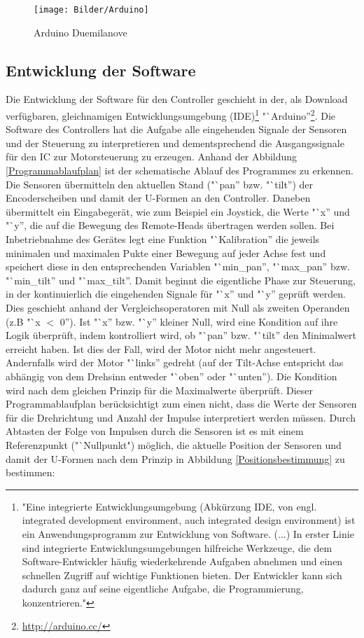 \documentclass[a4paper, 12pt, bibliography=totocnumbered, listof=numbered]{scrartcl}
\begin{document}
	\begin{figure}[htb]
		\centering
		\texttt{[image: Bilder/Arduino]}
		\caption{Arduino Duemilanove}
		\label{Arduino}
	\end{figure}

	\subsection{Entwicklung der Software}
	Die Entwicklung der Software für den Controller geschieht in der, als Download verfügbaren, gleichnamigen Entwicklungsumgebung (IDE)\footnote{"Eine integrierte Entwicklungsumgebung (Abkürzung IDE, von engl. integrated development environment, auch integrated design environment) ist ein Anwendungsprogramm zur Entwicklung von Software. (...) In erster Linie sind integrierte Entwicklungsumgebungen hilfreiche Werkzeuge, die dem Software-Entwickler häufig wiederkehrende Aufgaben abnehmen und einen schnellen Zugriff auf wichtige Funktionen bieten. Der Entwickler kann sich dadurch ganz auf seine eigentliche Aufgabe, die Programmierung, konzentrieren."\cite{wikipedia-ide}} "`Arduino”\footnote{\url{http://arduino.cc/}}.
	Die Software des Controllers hat die Aufgabe alle eingehenden Signale der Sensoren und der Steuerung zu interpretieren und dementsprechend die Ausgangssignale für den IC zur Motorsteuerung zu erzeugen.
	Anhand der Abbildung \ref{Programmablaufplan} ist der schematische Ablauf des Programmes zu erkennen. Die Sensoren übermitteln den aktuellen Stand ("`pan'' bzw. "`tilt'') der Encoderscheiben und damit der U-Formen an den Controller. Daneben übermittelt ein Eingabegerät, wie zum Beispiel ein Joystick, die Werte "`x'' und "`y'', die auf die Bewegung des Remote-Heads übertragen werden sollen. Bei Inbetriebnahme des Gerätes legt eine Funktion "`Kalibration'' die jeweils minimalen und maximalen Pukte einer Bewegung auf jeder Achse fest und speichert diese in den entsprechenden Variablen "`min\_pan'', "`max\_pan'' bzw. "`min\_tilt'' und "`max\_tilt''. Damit beginnt die eigentliche Phase zur Steuerung, in der kontinuierlich die eingehenden Signale für "`x'' und "`y'' geprüft werden. Dies geschieht anhand der Vergleichsoperatoren mit Null als zweiten Operanden (z.B "`x $<$ 0''). Ist "`x'' bzw. "`y'' kleiner Null, wird eine Kondition auf ihre Logik überprüft, indem kontrolliert wird, ob "`pan'' bzw. "`tilt'' den Minimalwert erreicht haben. Ist dies der Fall, wird der Motor nicht mehr angesteuert. Andernfalls wird der Motor "`links'' gedreht (auf der Tilt-Achse entspricht das abhängig von dem Drehsinn entweder "`oben'' oder "`unten''). Die Kondition wird nach dem gleichen Prinzip für die Maximalwerte überprüft.
	Dieser Programmablaufplan berücksichtigt zum einen nicht, dass die Werte der Sensoren für die Drehrichtung und Anzahl der Impulse interpretiert werden müssen. Durch Abtasten der Folge von Impulsen durch die Sensoren ist es mit einem Referenzpunkt ("`Nullpunkt") möglich, die aktuelle Position der Sensoren und damit der U-Formen nach dem Prinzip in Abbildung \ref{Positionsbestimmung} zu bestimmen:
\end{document}
